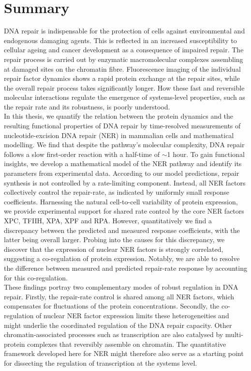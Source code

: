 \chapter*{Summary}
\thispagestyle{plain2}





DNA repair is indispensable for the protection of cells against environmental and endogenous damaging agents. This is reflected in an increased susceptibility to cellular ageing and cancer development as a consequence of impaired repair. The repair process is carried out by enzymatic macromolecular complexes assembling at damaged sites on the chromatin fibre. Fluorescence imaging of the individual repair factor dynamics shows a rapid protein exchange at the repair sites, while the overall repair process takes significantly longer. How these fast and reversible molecular interactions regulate the emergence of systems-level properties, such as the repair rate and its robustness, is poorly understood.\\ 
In this thesis, we quantify the relation between the protein dynamics and the resulting functional properties of DNA repair by time-resolved measurements of nucleotide-excision DNA repair (NER) in mammalian cells and mathematical modelling. We find that despite the pathway's molecular complexity, DNA repair follows a slow first-order reaction with a half-time of $\sim$1 hour. To gain functional insights, we develop a mathematical model of the NER pathway and identify its parameters from experimental data. According to our model predictions, repair synthesis is not controlled by a rate-limiting component. Instead, all NER factors collectively control the repair-rate, as indicated by uniformly small response coefficients. Harnessing the natural cell-to-cell variability of protein expression, we provide experimental support for shared rate control by the core NER factors XPC, TFIIH, XPA, XPF and RPA. However, quantitatively we find a discrepancy between the predicted and measured response coefficients, with the latter being overall larger. Probing into the causes for this discrepancy, we discover that the expression of nuclear NER factors is strongly correlated, suggesting a co-regulation of protein expression. Notably, we are able to resolve the difference between measured and predicted repair-rate response by accounting for this co-regulation. \\ 
These findings portray two complementary modes of robust regulation in DNA repair. Firstly, the repair-rate control is shared among all NER factors, which compensates for fluctuations of the protein concentrations. Secondly, the co-regulation of nuclear NER factor expression limits these heterogeneities and might underlie the coordinated regulation of the DNA repair capacity. Other chromatin-associated processes such as transcription are also catalysed by multi-protein complexes that reversibly assemble on chromatin. The quantitative framework developed here for NER might therefore also serve as a starting point for dissecting the regulation of transcription at the systems level.



      
 


%